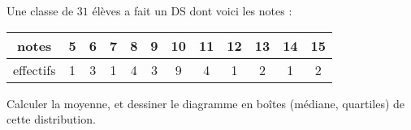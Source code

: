 
\begin{exercice}\label{exoSeconde-0032}

    Une classe de \( 31\) élèves a fait un DS dont voici les notes :

    \begin{center}
    \begin{tabular}{|c||c|c|c|c|c|c|c|c|c|c|c|}
        \hline
        notes&5&6&7&8&9&10&11&12&13&14&15\\
        \hline
        effectifs&1&3&1&4&3&9&4&1&2&1&2\\
        \hline
    \end{tabular}
    \end{center}

    Calculer la moyenne, et dessiner le diagramme en boîtes (médiane, quartiles) de cette distribution.


\end{exercice}
